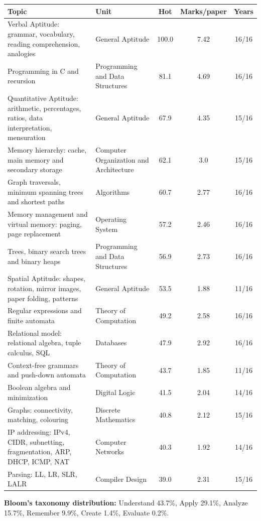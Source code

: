 {\small\begin{longtable}{@{}p{6.4cm}p{3.6cm}ccc@{}}\toprule \textbf{Topic} & \textbf{Unit} & \textbf{Hot} & \textbf{Marks/paper} & \textbf{Years}\\\midrule\endhead
Verbal Aptitude: grammar, vocabulary, reading comprehension, analogies & General Aptitude & 100.0 & 7.42 & 16/16\\
Programming in C and recursion & Programming and Data Structures & 81.1 & 4.69 & 16/16\\
Quantitative Aptitude: arithmetic, percentages, ratios, data interpretation, mensuration & General Aptitude & 67.9 & 4.35 & 15/16\\
Memory hierarchy: cache, main memory and secondary storage & Computer Organization and Architecture & 62.1 & 3.0 & 15/16\\
Graph traversals, minimum spanning trees and shortest paths & Algorithms & 60.7 & 2.77 & 16/16\\
Memory management and virtual memory: paging, page replacement & Operating System & 57.2 & 2.46 & 16/16\\
Trees, binary search trees and binary heaps & Programming and Data Structures & 56.9 & 2.73 & 16/16\\
Spatial Aptitude: shapes, rotation, mirror images, paper folding, patterns & General Aptitude & 53.5 & 1.88 & 11/16\\
Regular expressions and finite automata & Theory of Computation & 49.2 & 2.58 & 16/16\\
Relational model: relational algebra, tuple calculus, SQL & Databases & 47.9 & 2.92 & 16/16\\
Context-free grammars and push-down automata & Theory of Computation & 43.7 & 1.85 & 11/16\\
Boolean algebra and minimization & Digital Logic & 41.5 & 2.04 & 14/16\\
Graphs: connectivity, matching, colouring & Discrete Mathematics & 40.8 & 2.12 & 15/16\\
IP addressing: IPv4, CIDR, subnetting, fragmentation, ARP, DHCP, ICMP, NAT & Computer Networks & 40.3 & 1.92 & 14/16\\
Parsing: LL, LR, SLR, LALR & Compiler Design & 39.0 & 2.31 & 15/16\\
\bottomrule\end{longtable}}
\noindent\textbf{Bloom's taxonomy distribution:} Understand 43.7\%, Apply 29.1\%, Analyze 15.7\%, Remember 9.9\%, Create 1.4\%, Evaluate 0.2\%.\par
